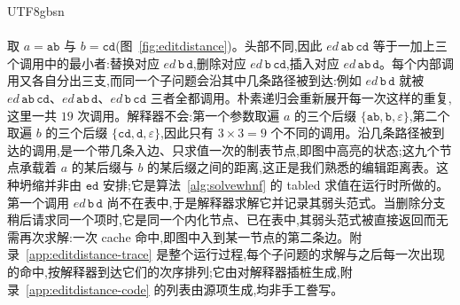 \begin{CJK*}{UTF8}{gbsn}
  \paragraph{}
  \ifPaperChinese
  取 $a=\mathtt{ab}$ 与 $b=\mathtt{cd}$(图~\ref{fig:editdistance})。头部不同,因此 $\mathit{ed}\,\mathtt{ab}\,\mathtt{cd}$ 等于一加上三个调用中的最小者:替换对应 $\mathit{ed}\,\mathtt{b}\,\mathtt{d}$,删除对应 $\mathit{ed}\,\mathtt{b}\,\mathtt{cd}$,插入对应 $\mathit{ed}\,\mathtt{ab}\,\mathtt{d}$。每个内部调用又各自分出三支,而同一个子问题会沿其中几条路径被到达:例如 $\mathit{ed}\,\mathtt{b}\,\mathtt{d}$ 就被 $\mathit{ed}\,\mathtt{ab}\,\mathtt{cd}$、$\mathit{ed}\,\mathtt{ab}\,\mathtt{d}$、$\mathit{ed}\,\mathtt{b}\,\mathtt{cd}$ 三者全都调用。朴素递归会重新展开每一次这样的重复,这里一共 $19$ 次调用。解释器不会:第一个参数取遍 $a$ 的三个后缀 $\{\mathtt{ab},\mathtt{b},\varepsilon\}$,第二个取遍 $b$ 的三个后缀 $\{\mathtt{cd},\mathtt{d},\varepsilon\}$,因此只有 $3\times 3=9$ 个不同的调用。沿几条路径被到达的调用,是一个带几条入边、只求值一次的制表节点,即图中高亮的状态;这九个节点承载着 $a$ 的某后缀与 $b$ 的某后缀之间的距离,这正是我们熟悉的编辑距离表。这种坍缩并非由 $\mathtt{ed}$ 安排;它是算法~\ref{alg:solvewhnf} 的 tabled 求值在运行时所做的。第一个调用 $\mathit{ed}\,\mathtt{b}\,\mathtt{d}$ 尚不在表中,于是解释器求解它并记录其弱头范式。当删除分支稍后请求同一个项时,它是同一个内化节点、已在表中,其弱头范式被直接返回而无需再次求解:一次 cache 命中,即图中入到某一节点的第二条边。附录~\ref{app:editdistance-trace} 是整个运行过程,每个子问题的求解与之后每一次出现的命中,按解释器到达它们的次序排列;它由对解释器插桩生成,附录~\ref{app:editdistance-code} 的列表由源项生成,均非手工誊写。
  \else

\end{CJK*}
